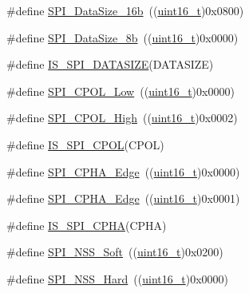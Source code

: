 \begin{DoxyCompactItemize}
\item 
\#define \hyperlink{group___s_p_i__data__size_ga8af2c8ca5c2162423531ebf560e0a41d}{S\+P\+I\+\_\+\+Data\+Size\+\_\+16b}~((\hyperlink{_p_e___types_8h_a1f1825b69244eb3ad2c7165ddc99c956}{uint16\+\_\+t})0x0800)
\item 
\#define \hyperlink{group___s_p_i__data__size_ga56721814a935922b6ca7c49060509765}{S\+P\+I\+\_\+\+Data\+Size\+\_\+8b}~((\hyperlink{_p_e___types_8h_a1f1825b69244eb3ad2c7165ddc99c956}{uint16\+\_\+t})0x0000)
\item 
\#define \hyperlink{group___s_p_i__data__size_gab6f9f528f7eb70373b9caf3548e44e67}{I\+S\+\_\+\+S\+P\+I\+\_\+\+D\+A\+T\+A\+S\+I\+ZE}(D\+A\+T\+A\+S\+I\+ZE)
\item 
\#define \hyperlink{group___s_p_i___clock___polarity_ga3dbc0234c4b4e7c37137e7c189f3c085}{S\+P\+I\+\_\+\+C\+P\+O\+L\+\_\+\+Low}~((\hyperlink{_p_e___types_8h_a1f1825b69244eb3ad2c7165ddc99c956}{uint16\+\_\+t})0x0000)
\item 
\#define \hyperlink{group___s_p_i___clock___polarity_ga4431f2edf42f8298d5bbe693351edbb0}{S\+P\+I\+\_\+\+C\+P\+O\+L\+\_\+\+High}~((\hyperlink{_p_e___types_8h_a1f1825b69244eb3ad2c7165ddc99c956}{uint16\+\_\+t})0x0002)
\item 
\#define \hyperlink{group___s_p_i___clock___polarity_gafc1cc5b1ff7e801a409a7a1e6047acf9}{I\+S\+\_\+\+S\+P\+I\+\_\+\+C\+P\+OL}(C\+P\+OL)
\item 
\#define \hyperlink{group___s_p_i___clock___phase_gaade9d9555fac8a302bde5c94da9c7292}{S\+P\+I\+\_\+\+C\+P\+H\+A\+\_\+Edge}~((\hyperlink{_p_e___types_8h_a1f1825b69244eb3ad2c7165ddc99c956}{uint16\+\_\+t})0x0000)
\item 
\#define \hyperlink{group___s_p_i___clock___phase_ga7543f88bf05a08705eb4203862dcebdf}{S\+P\+I\+\_\+\+C\+P\+H\+A\+\_\+Edge}~((\hyperlink{_p_e___types_8h_a1f1825b69244eb3ad2c7165ddc99c956}{uint16\+\_\+t})0x0001)
\item 
\#define \hyperlink{group___s_p_i___clock___phase_ga6441f08edf79dd5b243c54b888d3cbf7}{I\+S\+\_\+\+S\+P\+I\+\_\+\+C\+P\+HA}(C\+P\+HA)
\item 
\#define \hyperlink{group___s_p_i___slave___select__management_ga105969ee7eb635414da35b41e942e383}{S\+P\+I\+\_\+\+N\+S\+S\+\_\+\+Soft}~((\hyperlink{_p_e___types_8h_a1f1825b69244eb3ad2c7165ddc99c956}{uint16\+\_\+t})0x0200)
\item 
\#define \hyperlink{group___s_p_i___slave___select__management_ga07c547459d39fb7a6e0322147a60b74a}{S\+P\+I\+\_\+\+N\+S\+S\+\_\+\+Hard}~((\hyperlink{_p_e___types_8h_a1f1825b69244eb3ad2c7165ddc99c956}{uint16\+\_\+t})0x0000)

\end{DoxyCompactItemize}
